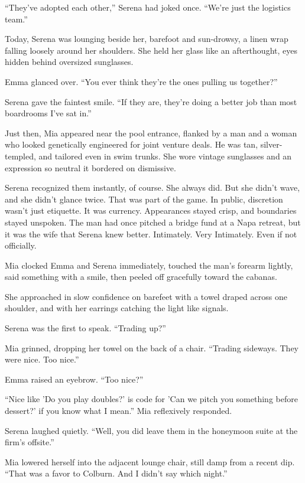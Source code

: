 ``They’ve adopted each other,'' Serena had joked once. ``We’re just the logistics team.''

Today, Serena was lounging beside her, barefoot and sun-drowsy, a linen wrap falling loosely around her shoulders. 
She held her glass like an afterthought, eyes hidden behind oversized sunglasses.

Emma glanced over. ``You ever think they’re the ones pulling us together?''

Serena gave the faintest smile. ``If they are, they’re doing a better job than most boardrooms I’ve sat in.''

Just then, Mia appeared near the pool entrance, flanked by a man and a woman who looked genetically engineered for 
joint venture deals. He was tan, silver-templed, and tailored even in swim trunks. She wore vintage sunglasses and 
an expression so neutral it bordered on dismissive. 

Serena recognized them instantly, of course. She always did. But she didn’t wave, and she didn’t glance twice. That 
was part of the game. In public, discretion wasn’t just etiquette. It was currency. Appearances stayed crisp, and 
boundaries stayed unspoken. The man had once pitched a bridge fund at a Napa retreat, but it was the wife that Serena 
knew better. Intimately. Very Intimately. Even if not officially. 

Mia clocked Emma and Serena immediately, touched the man’s forearm lightly, said something with a smile, then peeled 
off gracefully toward the cabanas.

She approached in slow confidence on barefeet with a towel draped across one shoulder, and with her earrings catching 
the light like signals.

Serena was the first to speak. ``Trading up?''

Mia grinned, dropping her towel on the back of a chair. ``Trading sideways. They were nice. Too nice.''

Emma raised an eyebrow. ``Too nice?''

``Nice like 'Do you play doubles?' is code for 'Can we pitch you something before dessert?' if you know what I mean.''
Mia reflexively responded.

Serena laughed quietly. ``Well, you did leave them in the honeymoon suite at the firm’s offsite.''

Mia lowered herself into the adjacent lounge chair, still damp from a recent dip. ``That was a favor to Colburn. 
And I didn’t say which night.''

